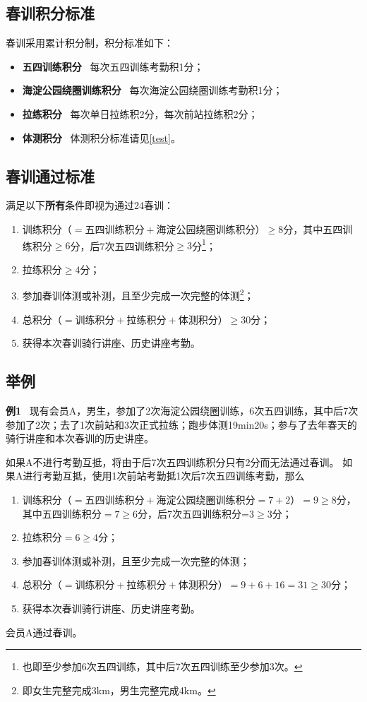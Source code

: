 \documentclass[UTF8]{ctexart}
\begin{document}
\subsection{春训积分标准}
春训采用累计积分制，积分标准如下：

\begin{itemize}[nosep,left=4em]
    \item \textbf{五四训练积分} \ 每次五四训练考勤积1分；
    \item \textbf{海淀公园绕圈训练积分} \ 每次海淀公园绕圈训练考勤积1分；
    \item \textbf{拉练积分} \  每次单日拉练积2分，每次前站拉练积2分；
    \item \textbf{体测积分} \  体测积分标准请见\ref{test}。 
\end{itemize}

\subsection{春训通过标准}

满足以下\textbf{所有}条件即视为通过24春训：
\begin{enumerate}[nosep,left=4em]
    \item 训练积分（$=\text{五四训练积分}+\text{海淀公园绕圈训练积分}$）$\ge 8$分，其中五四训练积分$\ge 6$分，后7次五四训练积分$\ge 3$分\footnote{也即至少参加6次五四训练，其中后7次五四训练至少参加3次。}；
    \item 拉练积分$\ge 4$分；
    \item 参加春训体测或补测，且至少完成一次完整的体测\footnote{即女生完整完成3km，男生完整完成4km。}；
    \item 总积分（$=\text{训练积分}+\text{拉练积分}+\text{体测积分}$）$\ge 30$分；
    \item 获得本次春训骑行讲座、历史讲座考勤。
\end{enumerate}

\subsection{举例}
\small{
    \textbf{例1} \ 现有会员A，男生，参加了2次海淀公园绕圈训练，6次五四训练，其中后7次参加了2次；去了1次前站和3次正式拉练；跑步体测19min20s；参与了去年春天的骑行讲座和本次春训的历史讲座。

如果A不进行考勤互抵，将由于后7次五四训练积分只有2分而无法通过春训。
如果A进行考勤互抵，使用1次前站考勤抵1次后7次五四训练考勤，那么
\begin{enumerate}[nosep,left=4em]
    \item 训练积分（$=\text{五四训练积分}+\text{海淀公园绕圈训练积分}=7+2$）$=9\ge 8$分，其中五四训练积分$=7\ge 6$分，后7次五四训练积分=3$\ge 3$分；
    \item 拉练积分$=6\ge 4$分；
    \item 参加春训体测或补测，且至少完成一次完整的体测；
    \item 总积分（$=\text{训练积分}+\text{拉练积分}+\text{体测积分}$）$=9+6+16=31\ge 30$分；
    \item 获得本次春训骑行讲座、历史讲座考勤。
\end{enumerate}

会员A通过春训。\\
}
\end{document}
